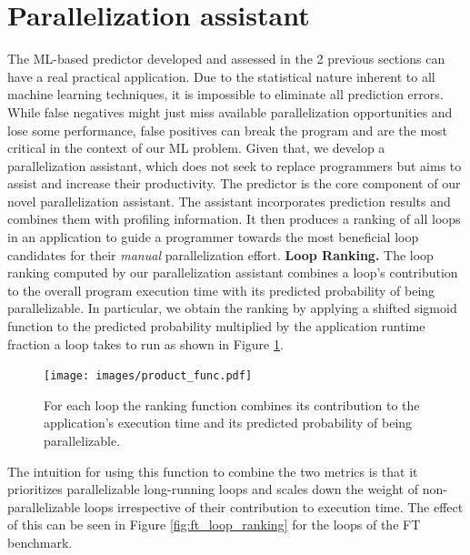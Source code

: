 \section{Parallelization assistant}
\label{practical_applications}
\quad The ML-based predictor developed and assessed in the 2 previous sections can have a real practical application. Due to the statistical nature inherent to all machine learning techniques, it is impossible to eliminate all prediction errors. While false negatives might just miss available parallelization opportunities and lose some performance, false positives can break the program and are the most critical in the context of our ML problem. Given that, we develop a parallelization assistant, which does not seek to replace programmers but aims to assist and increase their productivity. The predictor is the core component of our novel parallelization assistant. The assistant incorporates prediction results and combines them with profiling information. It then produces a ranking of all loops in an application to guide a programmer towards the most beneficial loop candidates for their \textit{manual} parallelization effort.\newline\null 
\quad \textbf{Loop Ranking.} The loop ranking computed by our parallelization assistant combines a loop's contribution to the overall program execution time with its predicted probability of being parallelizable. In particular, we obtain the ranking by applying a shifted sigmoid function to the predicted probability multiplied by the application runtime fraction a loop takes to run as shown in Figure \ref{fig:sigmoid_3d}.
\begin{figure}[ht]
\texttt{[image: images/product\_func.pdf]}
\centering
\caption{For each loop the ranking function combines its contribution to the application's execution time and its predicted probability of being parallelizable.}
\label{fig:sigmoid_3d}
\end{figure}
The intuition for using this function to combine the two metrics is that it prioritizes parallelizable long-running loops and scales down the weight of non-parallelizable loops irrespective of their contribution to execution time. The effect of this can be seen in Figure \ref{fig:ft_loop_ranking} for the loops of the FT benchmark.
